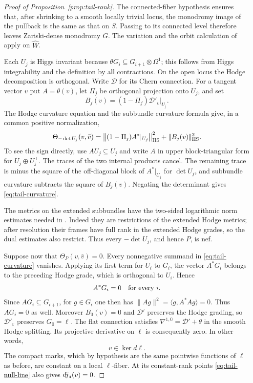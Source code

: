 \begin{proof}[Proof of Proposition~\ref{prop:tail-rank}]
The connected-fiber hypothesis ensures that, after
shrinking to a smooth locally trivial locus, the
monodromy image of the pullback is the same as that
on $S$.  Passing to its connected level therefore
leaves Zariski-dense monodromy $G$.  The variation
and the orbit calculation of 
apply on $\widehat W$.

Each $U_j$ is Higgs invariant because
$\theta G_i\subseteq G_{i+1}\otimes\Omega^1$; this
follows from Higgs integrability and the definition
by all contractions.  On the open locus the Hodge
decomposition is orthogonal.  Write $\mathcal D$ for
its Chern connection.  For a tangent vector $v$ put
$A=\theta(v)$, let $\Pi_j$ be orthogonal projection
onto $U_j$, and set
\[
             B_j(v)=(1-\Pi_j)\mathcal D'_v|_{U_j}.
\]
The Hodge curvature equation and the subbundle
curvature formula give, in a common positive
normalization,
\begin{equation}\label{eq:tail-curvature}
 \Theta_{-\det U_j}(v,\bar v)
   =\bigl\|(1-\Pi_j)A^*|_{U_j}\bigr\|_{\rm HS}^2
                      +\|B_j(v)\|_{\rm HS}^2.
\end{equation}
To see the sign directly, use $A U_j\subseteq U_j$
and write $A$ in upper block-triangular form for
$U_j\oplus U_j^\perp$.  The traces of the two
internal products cancel.  The remaining trace is
minus the square of the off-diagonal block of
$A^*|_{U_j}$ for $\det U_j$, and subbundle curvature
subtracts the square of $B_j(v)$.  Negating the
determinant gives \eqref{eq:tail-curvature}.

The metrics on the extended subbundles have the
two-sided logarithmic norm estimates needed in
.  Indeed they are restrictions
of the extended Hodge metrics; after resolution
their frames have full rank in the extended Hodge
grades, so the dual estimates also restrict.
Thus every $-\det U_j$, and hence $P$, is nef.

Suppose now that $\Theta_P(v,\bar v)=0$.  Every
nonnegative summand in \eqref{eq:tail-curvature}
vanishes.  Applying its first term for $U_i$ to
$G_i$, the vector $A^*G_i$ belongs to the preceding
Hodge grade, which is orthogonal to $U_i$.  Hence
\begin{equation}\label{eq:tail-zero-actions}
                A^*G_i=0\quad\hbox{for every }i.
\end{equation}
Since $AG_i\subseteq G_{i+1}$, for $g\in G_i$ one
then has $\|Ag\|^2=\langle g,A^*Ag\rangle=0$.
Thus $AG_i=0$ as well.  Moreover $B_0(v)=0$ and
$\mathcal D'$ preserves the Hodge grading, so
$\mathcal D'_v$ preserves $G_0=\ell$.  The flat
connection satisfies
$\nabla^{1,0}=\mathcal D'+\theta$ in the smooth
Hodge splitting.  Its projective derivative on
$\ell$ is consequently zero.  In other words,
\begin{equation}\label{eq:tail-null-line}
                         v\in\ker d\ell.
\end{equation}
The compact marks, which by hypothesis are the
same pointwise functions of $\ell$ as before,
are constant on a local $\ell$-fiber.  At its
constant-rank points \eqref{eq:tail-null-line}
also gives $dj_{\rm u}(v)=0$.


\end{proof}

